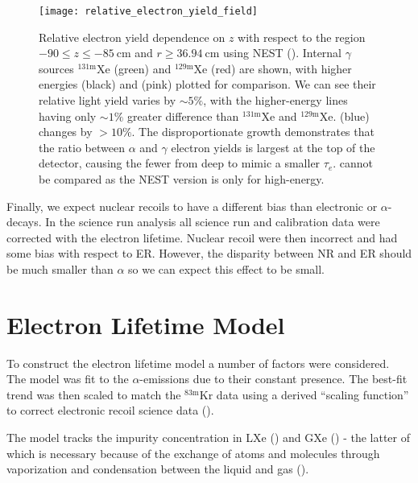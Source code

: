 \begin{figure}
\centering
\texttt{[image: relative\_electron\_yield\_field]}
\caption{Relative electron yield dependence on $z$ with respect to the region $-90 \leq z \leq -85\ \mathrm{cm}$ and
$r \geq 36.94\ \mathrm{cm}$ using NEST ().  Internal $\gamma$ sources $\mathrm{^{131m}Xe}$ (green) and
$\mathrm{^{129m}Xe}$
(red) are shown, with higher energies  (black) and  (pink) plotted for comparison.  We can see their relative
light yield varies by ${\sim} 5\%$, with the higher-energy lines having only ${\sim} 1\%$ greater difference than $\mathrm{^{131m}Xe}$ and
$\mathrm{^{129m}Xe}$.   (blue) changes by $> 10\%$.  The disproportionate growth demonstrates that the ratio between
$\alpha$ and $\gamma$ electron yields is largest at the top of the detector, causing the fewer \electron from deep \alphadecays to
mimic a smaller $\tau_e$.  \metakr cannot be compared as the NEST version is only for high-energy.}
\label{fig:electron_lifetimes_rn222_vs_kr83m_field_z}
\end{figure}

Finally, we expect nuclear recoils to have a different bias than electronic or $\alpha$-decays.  In the science run analysis all
science run and calibration data were corrected with the \metakr electron lifetime.  Nuclear recoil \cstwob were then incorrect and had
some bias with respect to ER.  However, the disparity between NR and ER should be much smaller than $\alpha$ so we can expect this effect
to be small.



\section{Electron Lifetime Model}
\label{sec:electron_lifetime_model}
To construct the electron lifetime model a number of factors were considered.  The model was fit to the  $\alpha$-emissions
due to their constant presence.  The best-fit trend was then scaled to match the $\mathrm{^{83m}Kr}$ data using a derived
``scaling function'' to correct electronic recoil science data ().

The model tracks the impurity concentration in LXe (\il) and GXe (\ig) - the latter of which is necessary because of the
exchange of atoms and molecules through vaporization and condensation between the liquid and gas
().



